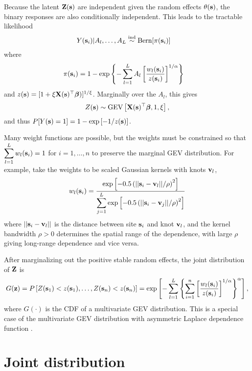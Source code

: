 \documentclass[12pt]{article}
\begin{document}
Because the latent $\mathbf{Z}(\mathbf{s})$ are independent given the random effects $\theta(\mathbf{s})$, the binary responses are also conditionally independent.
This leads to the tractable likelihood
\begin{align} \label{rbeq:condlike}
Y(\mathbf{s}_i) | A_l, \ldots, A_L &\stackrel{\mathrm{ind}}{\sim} \text{Bern}[\pi(\mathbf{s}_i)]
\end{align}
where
\begin{align} \label{rbeq:pyeq1cond}
\pi(\mathbf{s}_i) &= 1 - \exp \left\{ -\displaystyle \sum_{ l = 1 }^{L} A_l \left[ \frac{ w_{l}(\mathbf{s}_i) }{ z(\mathbf{s}_i) } \right]^{ 1/\alpha} \right\}
\end{align}
and $z(\mathbf{s}) = [1 + \xi \mathbf{X}(\mathbf{s})^\top \mbox{\boldmath $\beta$})]^{1 / \xi}$.
Marginally over the $A_l$, this gives
\begin{align}
Z(\mathbf{s}) \sim \text{GEV}\left[\mathbf{X}(\mathbf{s})^\top \mbox{\boldmath $\beta$}, 1, \xi\right],
\end{align}
and thus $P[Y(\mathbf{s}) = 1] = 1 - \exp\left[- 1 / z(\mathbf{s})\right]$.

Many weight functions are possible, but the weights must be constrained so that $\displaystyle \sum_{l=1}^L w_{l}(\mathbf{s}_i)=1$ for $i=1,\ldots,n$ to preserve the marginal GEV distribution.
For example, \cite{Reich2012} take the weights to be scaled Gaussian kernels with knots $\mathbf{v}_l$,
\begin{align}\label{rbeq:w}
w_{l}(\mathbf{s}_i) = \frac{\exp\left[-0.5\left(||\mathbf{s}_i-\mathbf{v}_l||/\rho\right)^2\right]}
{\displaystyle \sum_{j=1}^L\exp\left[-0.5\left(||\mathbf{s}_i-\mathbf{v}_j||/\rho\right)^2\right]}
\end{align}
where $||\mathbf{s}_i - \mathbf{v}_l||$ is the distance between site $\mathbf{s}_i$ and knot $\mathbf{v}_l$, and the kernel bandwidth $\rho>0$ determines the spatial range of the dependence, with large $\rho$ giving long-range dependence and vice versa.

After marginalizing out the positive stable random effects, the joint distribution of $\mathbf{Z}$ is
\begin{align}\label{rbeq:jointCDF}
G(\mathbf{z}) = P\left[Z(\mathbf{s}_1) < z(\mathbf{s}_1), \ldots, Z(\mathbf{s}_n) < z(\mathbf{s}_n)\right] = \exp\left[-\sum_{l=1}^L\left\{\sum_{i=1}^n\left[\frac{w_{l}(\mathbf{s}_i)}{z(\mathbf{s}_i)}\right]^{1/\alpha}\right\}^{\alpha}\right],
\end{align}
where $G(\cdot)$ is the CDF of a multivariate GEV distribution.
This is a special case of the multivariate GEV distribution with asymmetric Laplace dependence function \citep{Tawn1990}.

\section{Joint distribution}\label{rbs:multivariate}
\end{document}
